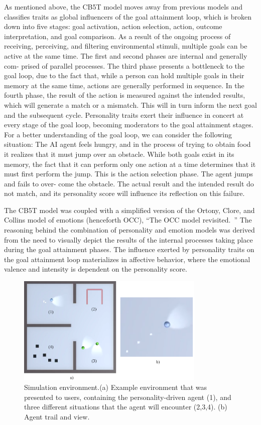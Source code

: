 As mentioned above, the CB5T model moves away from previous models and classifies traits as global influencers of the goal attainment loop, which is broken down into five stages: goal activation, action selection, action, outcome interpretation, and goal comparison. As a result of the ongoing process of receiving, perceiving, and filtering environmental stimuli, multiple goals can be active at the same time. The first and second phases are internal and generally com- prised of parallel processes. The third phase presents a bottleneck to the goal loop, due to the fact that, while a person can hold multiple goals in their memory at the same time, actions are generally performed in sequence. In the fourth phase, the result of the action is measured against the intended results, which  will generate a match or a mismatch. This will in turn inform the next goal and the subsequent cycle. Personality traits exert their influence in concert at every stage of the goal loop, becoming moderators to the goal attainment stages. For a better understanding of the goal loop, we can consider the following situation: The AI agent feels hungry, and in the process of trying to obtain food it realizes that it must jump over an obstacle. While both goals exist in its memory, the fact that it can perform only one action at a time determines that it must first perform the jump. This is the action selection phase. The agent jumps and fails to over- come the obstacle. The actual result and the intended result do not match, and its personality score will influence its reflection on this failure.

The CB5T model was coupled with a simplified version of the  Ortony, Clore, and Collins model of emotions (henceforth OCC), “The OCC model revisited.~” The reasoning behind the combination of personality and emotion models was derived from the need to visually depict the results of the internal processes taking place during the goal attainment phases. The influence exerted by personality traits on the goal attainment loop materializes in affective behavior, where the emotional valence and intensity is dependent on the personality score.

\begin{figure}[ht!]
\centerline{\includegraphics[width=0.8\textwidth]{figure-1-composed.png}}
\caption{Simulation environment.(a) Example environment that was presented to users, containing the personality-driven agent (1), and three different situations that the agent will encounter (2,3,4). (b)	Agent trail and view.}
\label{figs:env-agent}
\end{figure}


